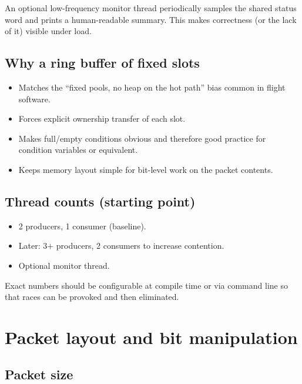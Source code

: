 \documentclass[11pt,a4paper]{article}
\begin{document}
An optional low-frequency monitor thread periodically samples the shared status word and prints a human-readable summary. This makes correctness (or the lack of it) visible under load.

\subsection{Why a ring buffer of fixed slots}

\begin{itemize}[leftmargin=*]
    \item Matches the ``fixed pools, no heap on the hot path'' bias common in flight software.
    \item Forces explicit ownership transfer of each slot.
    \item Makes full/empty conditions obvious and therefore good practice for condition variables or equivalent.
    \item Keeps memory layout simple for bit-level work on the packet contents.
\end{itemize}

\subsection{Thread counts (starting point)}

\begin{itemize}[leftmargin=*]
    \item 2 producers, 1 consumer (baseline).
    \item Later: 3+ producers, 2 consumers to increase contention.
    \item Optional monitor thread.
\end{itemize}

Exact numbers should be configurable at compile time or via command line so that races can be provoked and then eliminated.

\section{Packet layout and bit manipulation}
\label{sec:packet}

\subsection{Packet size}
\end{document}
